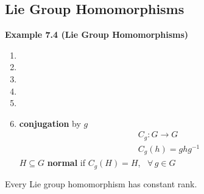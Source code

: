 \subsection*{Lie Group Homomorphisms}

\textbf{Example 7.4 (Lie Group Homomorphisms)}

\begin{enumerate}
\item[(a)]
\item[(b)]
\item[(c)]
\item[(d)]
\item[(e)]
\item[(f)] \textbf{conjugation} by $g$
\[
\begin{aligned}
  & C_g : G \to G \\ 
  & C_g(h) = ghg^{-1}
\end{aligned}
\]
$H \subseteq G$ \textbf{normal} if $C_g(H) = H$, \, $\forall \, g \in G$
\end{enumerate}

\begin{theorem}[7.5]
  Every Lie group homomorphism has constant rank.
\end{theorem}
